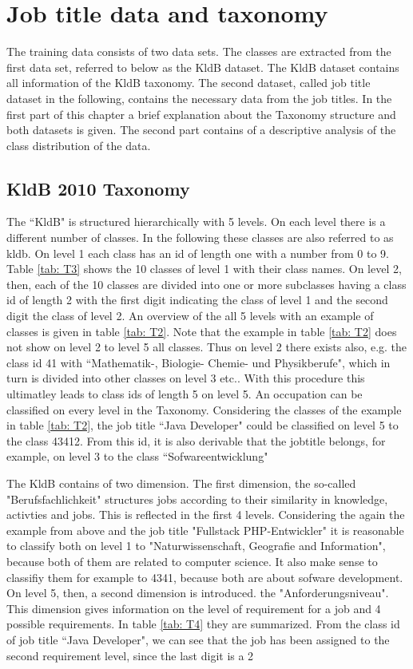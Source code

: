 \documentclass[12pt, a4paper, titlepage]{article}
\begin{document}
\section{Job title data and taxonomy}
The training data consists of two data sets. The classes are extracted from the first data set, referred to below as the \ac{KldB} dataset. The \ac{KldB} dataset contains all information of the \ac{KldB} taxonomy. The second dataset, called job title dataset in the following, contains the necessary data from the job titles. In the first part of this chapter a brief explanation about the Taxonomy structure and both datasets is given. The second part contains of a descriptive analysis of the class distribution of the data. 

\subsection{KldB 2010 Taxonomy}
The ``\ac{KldB}" is structured hierarchically with 5 levels. On each level there is a different number of classes. In the following these classes are also referred to as kldb. On level 1 each class has an id of length one with a number from 0 to 9. Table \ref{tab: T3} shows the 10 classes of level 1 with their class names. On level 2, then, each of the 10 classes are divided into one or more subclasses having a class id of length 2 with the first digit indicating the class of level 1 and the second digit the class of level 2. An overview of the all 5 levels with an example of classes is given in table \ref{tab: T2}. Note that the example in table \ref{tab: T2} does not show on level 2 to level 5 all classes. Thus on level 2 there exists also, e.g. the class id 41 with ``Mathematik-, Biologie- Chemie- und Physikberufe", which in turn is divided into other classes on level 3 etc..  With this procedure this ultimatley leads to class ids of length 5 on level 5. An occupation can be classified on every level in the Taxonomy. Considering the classes of the example in table \ref{tab: T2}, the job title ``Java Developer" could  be classified on level 5 to the class 43412. From this id, it is also derivable that the jobtitle belongs, for example, on level 3 to the class ``Sofwareentwicklung" \citep{Bundesagentur2011a, Bundesagentur2011b, Paulus2013}

The \ac{KldB} contains of two dimension. The first dimension, the so-called "Berufsfachlichkeit" structures jobs according to their similarity in knowledge, activties and jobs. This is reflected in the first 4 levels. Considering the again the example from above and the job title "Fullstack PHP-Entwickler" it is reasonable to classify both on level 1 to "Naturwissenschaft, Geografie and Information", because both of them are related to computer science. It also make sense to classifiy them for example to 4341, because both are about sofware development. On level 5, then, a second dimension is introduced. the "Anforderungsniveau". This dimension gives information on the level of requirement for a job and 4 possible requirements. In table \ref{tab: T4} they are summarized. From the class id of job title ``Java Developer", we can see that the job has been assigned to the second requirement level, since the last digit is a 2 \citep{Bundesagentur2011a,Bundesagentur2011b,Paulus2013}
\end{document}
